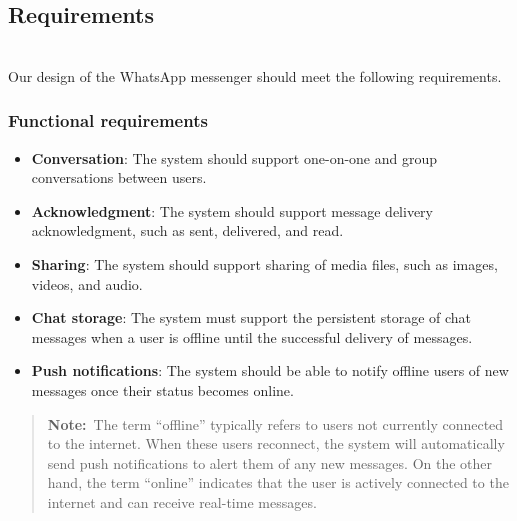 

\subsection{Requirements}\label{dsaF1YkAhSU5Hievz_XyF}
\\
Our design of the WhatsApp messenger should meet the following requirements.

\subsubsection{Functional requirements}\label{jk-11K5on-rCwYJ7oHmss}

\begin{itemize}
\item
\protect{}\label{rkGfsEyFJS0bCUZuwiIS-}
\textbf{Conversation}: The system should support one-on-one and group conversations between users.
\item
\protect{}\label{bKgDaJZz5KOzmYhuzYpey}
\textbf{Acknowledgment}: The system should support message delivery acknowledgment, such as sent, delivered, and read.
\item
\protect{}\label{rm8NiYdzDCOPFyITfhcj2}
\textbf{Sharing}: The system should support sharing of media files, such as images, videos, and audio.
\item
\protect{}\label{v_d0RcGLsomCyZlZrNgNn}
\textbf{Chat storage}: The system must support the persistent storage of chat messages when a user is offline until the successful delivery of messages.
\item
\protect{}\label{c2icROLehfz7igIW7ZU0j}
\textbf{Push notifications}: The system should be able to notify offline users of new messages once their status becomes online.
\end{itemize}
\begin{quote}
\textbf{Note:}~The term ``offline'' typically refers to users not currently connected to the internet. When these users reconnect, the system will automatically send push notifications to alert them of any new messages. On the other hand, the term ``online'' indicates that the user is actively connected to the internet and can receive real-time messages.
\end{quote}
